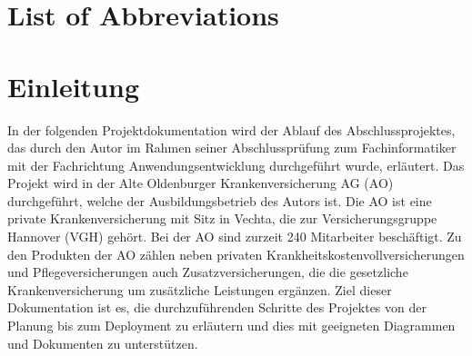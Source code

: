 \documentclass[a4paper,12pt]{book}
\begin{document}
\tableofcontents

\listoffigures


\listoftables
{}

\lstlistoflistings
{}

\chapter*{List of Abbreviations}

\begin{acronym}
\end{acronym}

\chapter{Einleitung}

In der folgenden Projektdokumentation wird der Ablauf des Abschlussprojektes, das durch den Autor im Rahmen seiner Abschlussprüfung zum Fachinformatiker mit der Fachrichtung Anwendungsentwicklung durchgeführt wurde, erläutert. Das Projekt wird in der Alte Oldenburger Krankenversicherung AG (AO) durchgeführt, welche der Ausbildungsbetrieb des Autors ist. Die AO ist eine private Krankenversicherung mit Sitz in Vechta, die zur Versicherungsgruppe Hannover (VGH) gehört. Bei der AO sind zurzeit 240 Mitarbeiter beschäftigt.  Zu den Produkten der AO zählen neben privaten Krankheitskostenvollversicherungen und Pflegeversicherungen auch Zusatzversicherungen, die die gesetzliche Krankenversicherung um zusätzliche Leistungen ergänzen. Ziel dieser Dokumentation ist es, die durchzuführenden Schritte des Projektes von der Planung bis zum Deployment zu erläutern und dies mit geeigneten Diagrammen und Dokumenten zu unterstützen.
\end{document}
